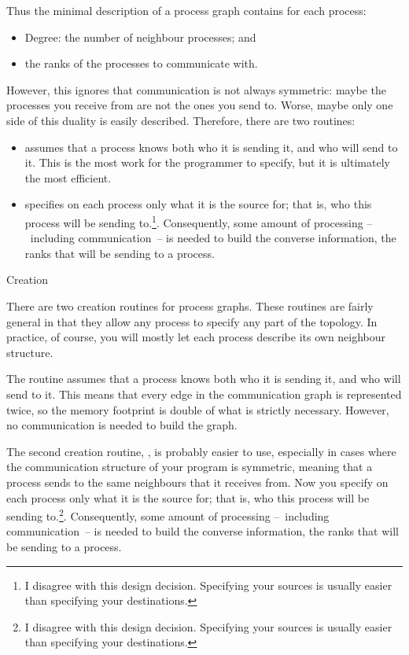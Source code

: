 Thus the minimal description of a process graph contains for each process:
\begin{itemize}
\item Degree: the number of neighbour processes; and
\item the ranks of the processes to communicate with.
\end{itemize}
However, this ignores that communication is not always symmetric:
maybe the processes you receive from are not the ones you send
to. Worse, maybe only one side of this duality is easily
described. Therefore, there are two routines:
\begin{itemize}
\item {} assumes that a
  process knows both who it is sending it, and who will send to
  it. This is the most work for the programmer to specify, but it is
  ultimately the most efficient.
\item {} specifies on each process
  only what it is the source for; that is, who this process will be sending
  to.\footnote{I disagree with this design decision. Specifying your
    sources is usually easier than specifying your
    destinations.}. Consequently, some amount of processing
  --~including communication~-- is needed to build the converse
  information, the ranks that will be sending to a process.
\end{itemize}

 {Creation}

There are two creation routines for process graphs. These routines are
fairly general in that they allow any process to specify any part of
the topology. In practice, of course, you will mostly let each process
describe its own neighbour structure.

The routine  assumes that a process
knows both who it is sending it, and who will send to it. This means
that every edge in the communication graph is represented twice, so
the memory footprint is double of what is strictly necessary. However,
no communication is needed to build the graph.

The second creation routine, , is
probably easier to use, especially in cases where the communication
structure of your program is symmetric, meaning that a process sends
to the same neighbours that it receives from.  Now you specify on each
process only what it is the source for; that is, who this process will
be sending to.\footnote{I disagree with this design
  decision. Specifying your sources is usually easier than specifying
  your destinations.}. Consequently, some amount of processing
--~including communication~-- is needed to build the converse
information, the ranks that will be sending to a process.

